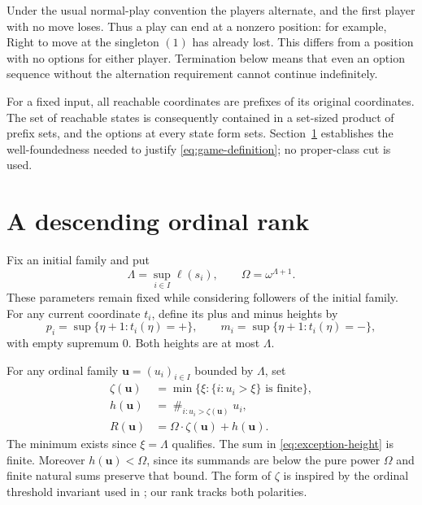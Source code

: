 \documentclass[11pt,letterpaper]{article}
\theoremstyle{definition}
\theoremstyle{remark}
\newcommand{\bu}{\boldsymbol{u}}
\newcommand{\natsum}{\mathop{\#}}
\newcommand{\len}{\ell}
\newcommand{\signplus}{\mathtt{+}}
\newcommand{\signminus}{\mathtt{-}}
\begin{document}
Under the usual normal-play convention the players alternate, and the first
player with no move loses. Thus a play can end at a nonzero position: for
example, Right to move at the singleton $(1)$ has already lost. This differs
from a position with no options for either player. Termination below means
that even an option sequence without the alternation requirement cannot
continue indefinitely.

For a fixed input, all reachable coordinates are prefixes of its original
coordinates. The set of reachable states is consequently contained in a
set-sized product of prefix sets, and the options at every state form sets.
Section~\ref{sec:rank} establishes the well-foundedness needed to justify
\eqref{eq:game-definition}; no proper-class cut is used.

\section{A descending ordinal rank}\label{sec:rank}

Fix an initial family and put
\begin{equation}\label{eq:rank-bound-parameters}
 \Lambda=\sup_{i\in I}\len(s_i),\qquad \Omega=\omega^{\Lambda+1}.
\end{equation}
These parameters remain fixed while considering followers of the initial
family. For any current coordinate $t_i$, define its plus and minus heights by
\begin{equation}\label{eq:polarity-heights}
 p_i=\sup\{\eta+1:t_i(\eta)=\signplus\},\qquad
 m_i=\sup\{\eta+1:t_i(\eta)=\signminus\},
\end{equation}
with empty supremum $0$. Both heights are at most $\Lambda$.

For any ordinal family $\bu=(u_i)_{i\in I}$ bounded by $\Lambda$, set
\begin{align}
 \zeta(\bu)&=\min\{\xi:\{i:u_i>\xi\}\text{ is finite}\},\label{eq:zeta}\\
 h(\bu)&=\natsum_{i:u_i>\zeta(\bu)}u_i,\label{eq:exception-height}\\
 R(\bu)&=\Omega\cdot\zeta(\bu)+h(\bu).\label{eq:one-rank}
\end{align}
The minimum exists since $\xi=\Lambda$ qualifies. The sum in
\eqref{eq:exception-height} is finite. Moreover $h(\bu)<\Omega$, since its
summands are below the pure power $\Omega$ and finite natural sums preserve that
bound. The form of $\zeta$ is inspired by the ordinal threshold invariant used
in \cite{lipparini2026}; our rank tracks both polarities.
\end{document}
